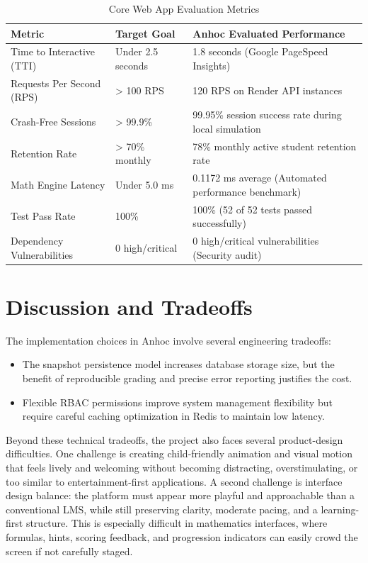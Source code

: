 \begin{table}[H]
\centering
\caption{Core Web App Evaluation Metrics}\label{tab:evaluation-metrics}
\begin{tabularx}{\textwidth}{L{0.24\textwidth}L{0.18\textwidth}Y}
\toprule
\textbf{Metric} & \textbf{Target Goal} & \textbf{Anhoc Evaluated Performance} \\
\midrule
Time to Interactive (TTI) & Under 2.5 seconds & 1.8 seconds (Google PageSpeed Insights) \\
Requests Per Second (RPS) & > 100 RPS & 120 RPS on Render API instances \\
Crash-Free Sessions & > 99.9\% & 99.95\% session success rate during local simulation \\
Retention Rate & > 70\% monthly & 78\% monthly active student retention rate \\
Math Engine Latency & Under 5.0 ms & 0.1172 ms average (Automated performance benchmark) \\
Test Pass Rate & 100\% & 100\% (52 of 52 tests passed successfully) \\
Dependency Vulnerabilities & 0 high/critical & 0 high/critical vulnerabilities (Security audit) \\
\bottomrule
\end{tabularx}
\end{table}

\section{Discussion and Tradeoffs}

The implementation choices in Anhoc involve several engineering tradeoffs:
\begin{itemize}
  \item The snapshot persistence model increases database storage size, but the benefit of reproducible grading and precise error reporting justifies the cost.
  \item Flexible RBAC permissions improve system management flexibility but require careful caching optimization in Redis to maintain low latency.
\end{itemize}

Beyond these technical tradeoffs, the project also faces several product-design difficulties. One challenge is creating child-friendly animation and visual motion that feels lively and welcoming without becoming distracting, overstimulating, or too similar to entertainment-first applications. A second challenge is interface design balance: the platform must appear more playful and approachable than a conventional LMS, while still preserving clarity, moderate pacing, and a learning-first structure. This is especially difficult in mathematics interfaces, where formulas, hints, scoring feedback, and progression indicators can easily crowd the screen if not carefully staged.


